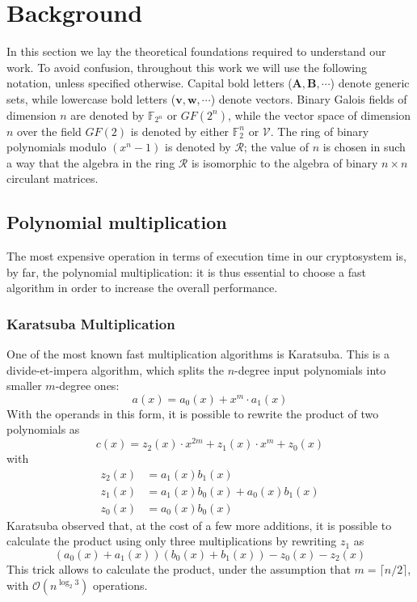 \documentclass[11pt,a4paper,twocolumn]{article}
\theoremstyle{definition}
\begin{document}
\section{Background}
\label{sec:background}
In this section we lay the theoretical foundations required to understand our work.
To avoid confusion, throughout this work we will use the following notation, unless specified otherwise.
Capital bold letters ($\mathbf{A}, \mathbf{B}, \cdots$) denote generic sets, while lowercase
bold letters ($\mathbf{v}, \mathbf{w}, \cdots$) denote vectors. Binary Galois fields of dimension $n$ are denoted
by $\mathds{F}_{2^n}$ or $GF(2^n)$, while the vector space of dimension $n$ over the field $GF(2)$ is denoted by
either $\mathds{F}_2^n$ or $\mathcal{V}$. The ring of binary polynomials modulo $(x^n-1)$ is denoted by $\mathcal{R}$; 
the value of $n$ is chosen in such a way that the algebra in the ring $\mathcal{R}$ is isomorphic to the algebra
of binary $n\times n$ circulant matrices.

\subsection{Polynomial multiplication}
The most expensive operation in terms of execution time in our cryptosystem is, by far, the polynomial multiplication:
it is thus essential to choose a fast algorithm in order to increase the overall performance.

\subsubsection{Karatsuba Multiplication}
One of the most known fast multiplication algorithms is Karatsuba. This is a divide-et-impera algorithm, which
splits the $n$-degree input polynomials into smaller $m$-degree ones:
\begin{equation*}
    a(x) = a_0(x) +x^m\cdot a_1(x)
\end{equation*}
With the operands in this form, it is possible to rewrite the product of two polynomials as
\begin{equation*}
    c(x) = z_2(x)\cdot x^{2m}+z_1(x)\cdot x^m + z_0(x)
\end{equation*}
with
\begin{equation*}
    \begin{aligned}
        z_2(x) &= a_1(x)b_1(x)\\
        z_1(x) &= a_1(x)b_0(x) + a_0(x)b_1(x)\\
        z_0(x) &= a_0(x)b_0(x)
    \end{aligned}
\end{equation*}
Karatsuba observed that, at the cost of a few more additions, it is possible to calculate
the product using only three multiplications by rewriting $z_1$ as
\begin{equation*}
    (a_0(x)+a_1(x))(b_0(x)+b_1(x))-z_0(x)-z_2(x)
\end{equation*}
This trick allows to calculate the product, under the assumption that $m = \lceil n/2 \rceil$, 
with $\mathcal{O}(n^{\log_2 3})$ operations.
\end{document}
